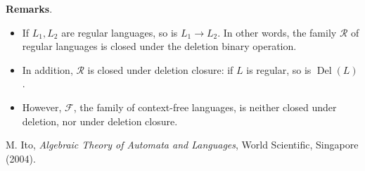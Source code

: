 \documentclass[12pt]{article}
\begin{document}
\textbf{Remarks}.
\begin{itemize}
\item If $L_1,L_2$ are regular languages, so is $L_1 \longrightarrow L_2$.  In other words, the family $\mathscr{R}$ of regular languages is closed under the deletion binary operation.
\item In addition, $\mathscr{R}$ is closed under deletion closure: if $L$ is regular, so is $\operatorname{Del}(L)$.
\item However, $\mathscr{F}$, the family of context-free languages, is neither closed under deletion, nor under deletion closure.
\end{itemize}

\begin{thebibliography}{9}
 M. Ito, {\em Algebraic Theory of Automata and Languages}, World Scientific, Singapore (2004).
\end{thebibliography}
\end{document}
